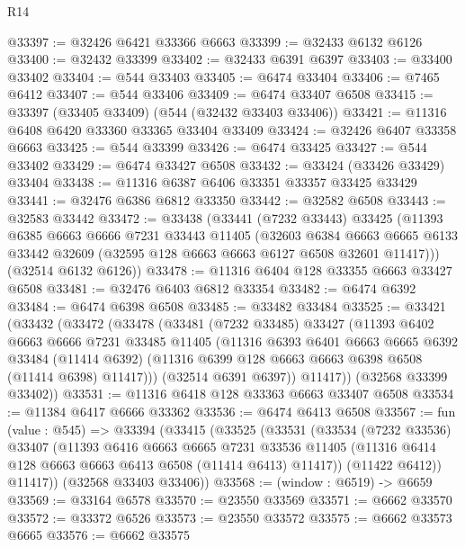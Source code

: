 \begin{lexlean}{R14}
\begin{coremodule}
@33397 := @32426 @6421 @33366 @6663
@33399 := @32433 @6132 @6126
@33400 := @32432 @33399
@33402 := @32433 @6391 @6397
@33403 := @33400 @33402
@33404 := @544 @33403
@33405 := @6474 @33404
@33406 := @7465 @6412
@33407 := @544 @33406
@33409 := @6474 @33407 @6508
@33415 := @33397 (@33405 @33409) (@544 (@32432 @33403 @33406))
@33421 := @11316 @6408 @6420 @33360 @33365 @33404 @33409
@33424 := @32426 @6407 @33358 @6663
@33425 := @544 @33399
@33426 := @6474 @33425
@33427 := @544 @33402
@33429 := @6474 @33427 @6508
@33432 := @33424 (@33426 @33429) @33404
@33438 := @11316 @6387 @6406 @33351 @33357 @33425 @33429
@33441 := @32476 @6386 @6812 @33350
@33442 := @32582 @6508
@33443 := @32583 @33442
@33472 := @33438
    (@33441
      (@7232 @33443)
      @33425
      (@11393
        @6385
        @6663
        @6666
        @7231
        @33443
        @11405
        (@32603
          @6384
          @6663
          @6665
          @6133
          @33442
          @32609
          (@32595 @128 @6663 @6663 @6127 @6508 @32601 @11417)))
      (@32514 @6132 @6126))
@33478 := @11316 @6404 @128 @33355 @6663 @33427 @6508
@33481 := @32476 @6403 @6812 @33354
@33482 := @6474 @6392
@33484 := @6474 @6398 @6508
@33485 := @33482 @33484
@33525 := @33421
    (@33432
      (@33472
        (@33478
          (@33481
            (@7232 @33485)
            @33427
            (@11393
              @6402
              @6663
              @6666
              @7231
              @33485
              @11405
              (@11316
                @6393
                @6401
                @6663
                @6665
                @6392
                @33484
                (@11414 @6392)
                (@11316 @6399 @128 @6663 @6663 @6398 @6508 (@11414 @6398) @11417)))
            (@32514 @6391 @6397))
          @11417))
      (@32568 @33399 @33402))
@33531 := @11316 @6418 @128 @33363 @6663 @33407 @6508
@33534 := @11384 @6417 @6666 @33362
@33536 := @6474 @6413 @6508
@33567 := fun (value : @545) =>
  @33394
    (@33415
      (@33525
        (@33531
          (@33534
            (@7232 @33536)
            @33407
            (@11393
              @6416
              @6663
              @6665
              @7231
              @33536
              @11405
              (@11316 @6414 @128 @6663 @6663 @6413 @6508 (@11414 @6413) @11417))
            (@11422 @6412))
          @11417))
      (@32568 @33403 @33406))
@33568 := (window : @6519) -> @6659
@33569 := @33164 @6578
@33570 := @23550 @33569
@33571 := @6662 @33570
@33572 := @33372 @6526
@33573 := @23550 @33572
@33575 := @6662 @33573 @6665
@33576 := @6662 @33575

\end{coremodule}
\end{lexlean}
